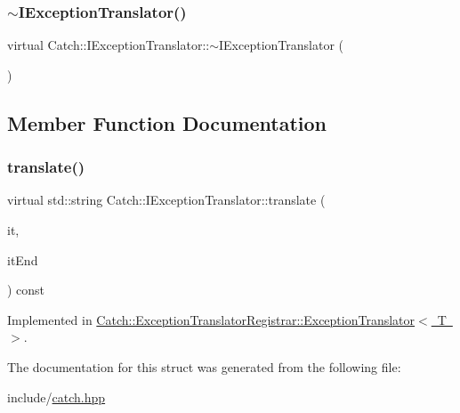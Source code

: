 \subsubsection{\texorpdfstring{$\sim$IExceptionTranslator()}{~IExceptionTranslator()}}
{\footnotesize\ttfamily virtual Catch\+::\+I\+Exception\+Translator\+::$\sim$\+I\+Exception\+Translator (\begin{DoxyParamCaption}{ }\end{DoxyParamCaption})\hspace{0.3cm}{\ttfamily [virtual]}}



\subsection{Member Function Documentation}
\mbox{\label{struct_catch_1_1_i_exception_translator_a2a554b96ed5ed411e7c796b6b42837a5}} 
\subsubsection{\texorpdfstring{translate()}{translate()}}
{\footnotesize\ttfamily virtual std\+::string Catch\+::\+I\+Exception\+Translator\+::translate (\begin{DoxyParamCaption}\item[{Exception\+Translators\+::const\+\_\+iterator}]{it,  }\item[{Exception\+Translators\+::const\+\_\+iterator}]{it\+End }\end{DoxyParamCaption}) const\hspace{0.3cm}{\ttfamily [pure virtual]}}



Implemented in \mbox{\hyperlink{class_catch_1_1_exception_translator_registrar_1_1_exception_translator_a29e85940ee9ce719f26e43550cb4ed48}{Catch\+::\+Exception\+Translator\+Registrar\+::\+Exception\+Translator$<$ T $>$}}.



The documentation for this struct was generated from the following file\+:\begin{DoxyCompactItemize}
\item 
include/\mbox{\hyperlink{catch_8hpp}{catch.\+hpp}}\end{DoxyCompactItemize}
